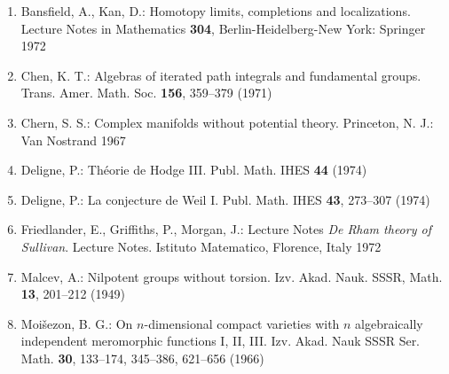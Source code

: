 \documentclass[
  french,
  a3paper,
  a3paper]{extarticle}
\begin{document}
\begin{enumerate}
\def\labelenumi{\arabic{enumi}.}
\item
  Bansfield, A., Kan, D.: Homotopy limits, completions and
  localizations. Lecture Notes in Mathematics \textbf{304},
  Berlin-Heidelberg-New York: Springer 1972
\item
  Chen, K. T.: Algebras of iterated path integrals and fundamental
  groups. Trans. Amer. Math. Soc. \textbf{156}, 359--379 (1971)
\item
  Chern, S. S.: Complex manifolds without potential theory. Princeton,
  N. J.: Van Nostrand 1967
\item
  Deligne, P.: Théorie de Hodge III. Publ. Math. IHES \textbf{44} (1974)
\item
  Deligne, P.: La conjecture de Weil I. Publ. Math. IHES \textbf{43},
  273--307 (1974)
\item
  Friedlander, E., Griffiths, P., Morgan, J.: Lecture Notes \emph{De
  Rham theory of Sullivan}. Lecture Notes. Istituto Matematico,
  Florence, Italy 1972
\item
  Malcev, A.: Nilpotent groups without torsion. Izv. Akad. Nauk. SSSR,
  Math. \textbf{13}, 201--212 (1949)
\item
  Moišezon, B. G.: On \(n\)-dimensional compact varieties with \(n\)
  algebraically independent meromorphic functions I, II, III. Izv. Akad.
  Nauk SSSR Ser. Math. \textbf{30}, 133--174, 345--386, 621--656 (1966)


\end{enumerate}
\end{document}
